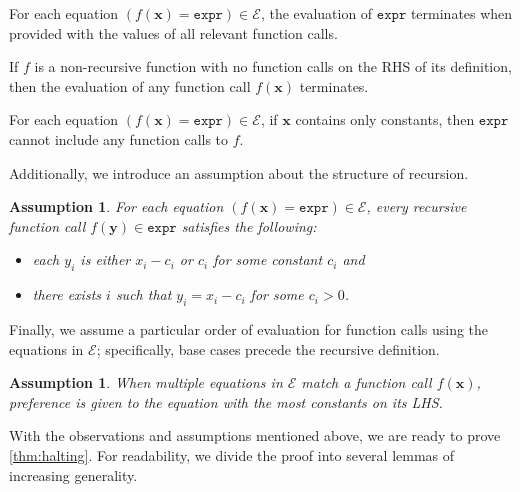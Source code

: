 \documentclass[a4paper,UKenglish,cleveref,autoref,thm-restate]{lipics-v2021}
\newcommand{\expr}{\mathtt{expr}}
\newtheorem{assumption}[theorem]{Assumption}
\begin{document}
\begin{observation}\label{assumption3}
  For each equation $(f(\mathbf{x}) = \expr) \in \mathcal{E}$, the evaluation
  of $\expr$ terminates when provided with the values of all relevant function
  calls.
\end{observation}

\begin{corollary}\label{fact}
  If $f$ is a non-recursive function with no function calls on the RHS of its
  definition, then the evaluation of any function call $f(\mathbf{x})$
  terminates.
\end{corollary}

\begin{observation}\label{fact2}
  For each equation $(f(\mathbf{x}) = \expr{}) \in \mathcal{E}$, if $\mathbf{x}$
  contains only constants, then $\expr{}$ cannot include any function calls to
  $f$.
\end{observation}

Additionally, we introduce an assumption about the structure of recursion.

\begin{assumption}\label{assumption4}
  For each equation $(f(\mathbf{x}) = \expr) \in \mathcal{E}$, every recursive
  function call $f(\mathbf{y}) \in \expr$ satisfies the following:
  \begin{itemize}
    \item each $y_{i}$ is either $x_{i} - c_{i}$ or $c_{i}$ for some constant
          $c_{i}$ and
    \item there exists $i$ such that $y_{i} = x_{i} - c_{i}$ for some
          $c_{i} > 0$.
  \end{itemize}
\end{assumption}

Finally, we assume a particular order of evaluation for function calls using the
equations in $\mathcal{E}$; specifically, base cases precede the recursive
definition.

\begin{assumption}
  When multiple equations in $\mathcal{E}$ match a function call
  $f(\mathbf{x})$, preference is given to the equation with the most constants
  on its LHS.
\end{assumption}

With the observations and assumptions mentioned above, we are ready to prove
\cref{thm:halting}. For readability, we divide the proof into several lemmas of
increasing generality.
\end{document}
